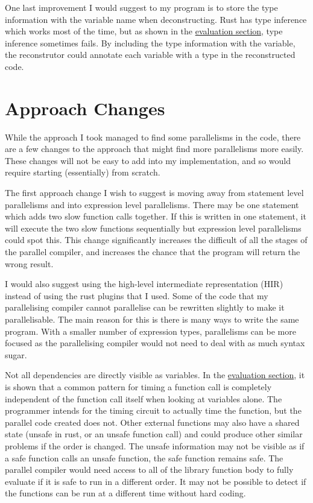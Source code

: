 One last improvement I would suggest to my program is to store the type information with the variable name when deconstructing. Rust has type inference which works most of the time, but as shown in the \hyperref[sec:evaluation]{evaluation section}, type inference sometimes fails. By including the type information with the variable, the reconstrutor could annotate each variable with a type in the reconstructed code.

\section{Approach Changes}
While the approach I took managed to find some parallelisms in the code, there are a few changes to the approach that might find more parallelisms more easily. These changes will not be easy to add into my implementation, and so would require starting (essentially) from scratch.

The first approach change I wish to suggest is moving away from statement level parallelisms and into expression level parallelisms. There may be one statement which adds two slow function calls together. If this is written in one statement, it will execute the two slow functions sequentially but expression level parallelisms could spot this. This change significantly increases the difficult of all the stages of the parallel compiler, and increases the chance that the program will return the wrong result.

I would also suggest using the high-level intermediate representation (HIR) instead of using the rust plugins that I used. Some of the code that my parallelising compiler cannot parallelise can be rewritten slightly to make it parallelisable. The main reason for this is there is many ways to write the same program. With a smaller number of expression types, parallelisms can be more focused as the parallelising compiler would not need to deal with as much syntax sugar.

Not all dependencies are directly visible as variables. In the \hyperref[sec:evaluation]{evaluation section}, it is shown that a common pattern for timing a function call is completely independent of the function call itself when looking at variables alone. The programmer intends for the timing circuit to actually time the function, but the parallel code created does not. Other external functions may also have a shared state (unsafe in rust, or an unsafe function call) and could produce other similar problems if the order is changed. The unsafe information may not be visible as if a safe function calls an unsafe function, the safe function remains safe. The parallel compiler would need access to all of the library function body to fully evaluate if it is safe to run in a different order. It may not be possible to detect if the functions can be run at a different time without hard coding.
